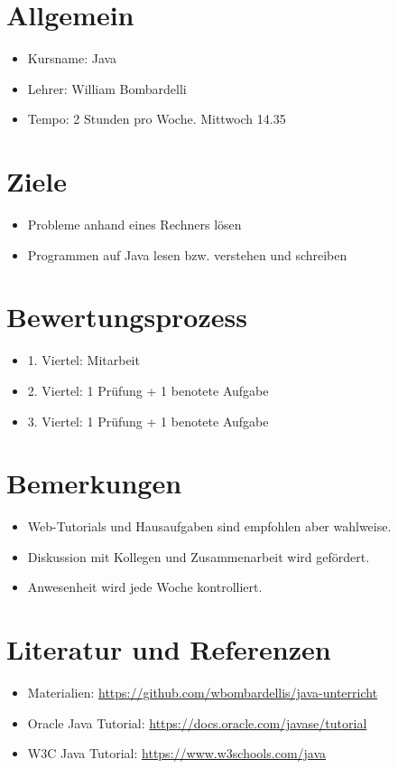 \documentclass[a4paper]{article}
\begin{document}
	
	
	\section{Allgemein}
	\begin{itemize}
		\item Kursname: Java
		\item Lehrer: William Bombardelli
		\item Tempo: 2 Stunden pro Woche. Mittwoch 14.35
	\end{itemize}
	
	\section{Ziele}
	\begin{itemize}
		\item Probleme anhand eines Rechners lösen
		\item Programmen auf Java lesen bzw. verstehen und schreiben 
	\end{itemize}

	\section{Bewertungsprozess}
	\begin{itemize}
		\item 1. Viertel: Mitarbeit
		\item 2. Viertel: 1 Prüfung + 1 benotete Aufgabe
		\item 3. Viertel: 1 Prüfung + 1 benotete Aufgabe
	\end{itemize}

	\section{Bemerkungen}
	\begin{itemize}
		\item Web-Tutorials und Hausaufgaben sind empfohlen aber wahlweise.
		\item Diskussion mit Kollegen und Zusammenarbeit wird gefördert.
		\item Anwesenheit wird jede Woche kontrolliert.
	\end{itemize}

	\section{Literatur und Referenzen}
	\begin{itemize}
		\item Materialien: \url{https://github.com/wbombardellis/java-unterricht}
		\item Oracle Java Tutorial: \url{https://docs.oracle.com/javase/tutorial}
		\item W3C Java Tutorial: \url{https://www.w3schools.com/java}
	\end{itemize}
\end{document}
